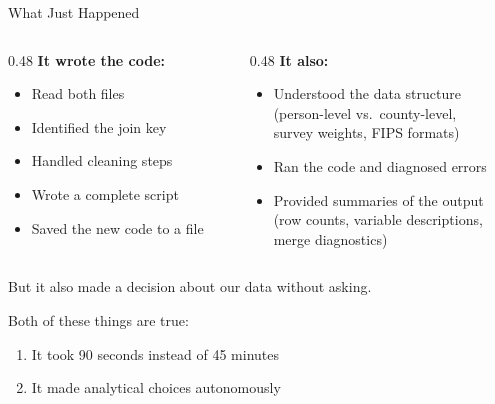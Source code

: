 \documentclass[aspectratio=169, 11pt]{beamer}
\begin{document}
\begin{frame}{What Just Happened}
  \begin{columns}[T]
    \begin{column}{0.48\textwidth}
      \textbf{It wrote the code:}
      \begin{itemize}
        \item Read both files
        \item Identified the join key
        \item Handled cleaning steps
        \item Wrote a complete script
        \item Saved the new code to a file
      \end{itemize}
    \end{column}
    \begin{column}{0.48\textwidth}
      \textbf{It also:}
      \begin{itemize}
        \item Understood the data structure\\
          {\small (person-level vs.\ county-level,\\survey weights, FIPS formats)}
        \item Ran the code and diagnosed errors
        \item Provided summaries of the output\\
          {\small (row counts, variable descriptions,\\merge diagnostics)}
      \end{itemize}
    \end{column}
  \end{columns}

  \vspace{0.5em}
  \alert{But it also made a decision about our data without asking.}

  \vspace{0.5em}
  Both of these things are true:
  \begin{enumerate}
    \item It took 90 seconds instead of 45 minutes
    \item It made analytical choices autonomously
  \end{enumerate}
\end{frame}


\end{document}
